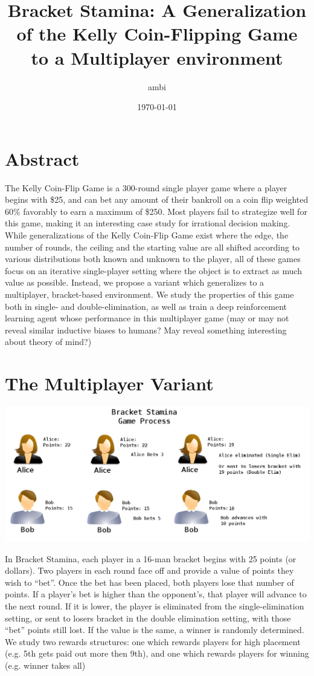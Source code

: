 \documentclass[11pt]{article}
\author{ambi}
\date{\today}
\title{Bracket Stamina: A Generalization of the Kelly Coin-Flipping Game to a Multiplayer environment}
\begin{document}
\maketitle
\tableofcontents


\section*{Abstract}
\label{sec:orgac327b4}

The Kelly Coin-Flip Game is a 300-round single player game where a player begins with \$25, and can bet any amount of their bankroll on a coin flip weighted 60\% favorably to earn a maximum of \$250. Most players fail to strategize well for this game, making it an interesting case study for irrational decision making. While generalizations of the Kelly Coin-Flip Game exist where the edge, the number of rounds, the ceiling and the starting value are all shifted according to various distributions both known and unknown to the player, all of these games focus on an iterative single-player setting where the object is to extract as much value as possible. Instead, we propose a variant which generalizes to a multiplayer, bracket-based environment. We study the properties of this game both in single- and double-elimination, as well as train a deep reinforcement learning agent whose performance in this multiplayer game (may or may not reveal similar inductive biases to humans? May reveal something interesting about theory of mind?)

\section*{The Multiplayer Variant}
\label{sec:orge8e7761}

\begin{center}
\includegraphics[width=.9\linewidth]{./bracketstam.png}
\end{center}

In Bracket Stamina, each player in a 16-man bracket begins with 25 points (or dollars). Two players in each round face off and provide a value of points they wish to “bet”. Once the bet has been placed, both players lose that number of points. If a player's bet is higher than the opponent’s, that player will advance to the next round. If it is lower, the player is eliminated from the single-elimination setting, or sent to losers bracket in the double elimination setting, with those “bet” points still lost. If the value is the same, a winner is randomly determined. We study two rewards structures: one which rewards players for high placement (e.g. 5th gets paid out more then 9th), and one which rewards players for winning (e.g. winner takes all)
\end{document}

